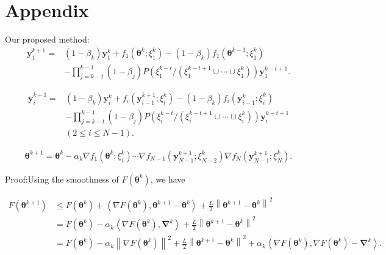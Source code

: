 

\appendix

\section{Appendix}

Our proposed method:
\begin{equation*}
\begin{split}
\boldsymbol{y}_{1}^{k+1}=&(1-\beta_k)\boldsymbol{y}_{1}^k+f_1(\boldsymbol{\theta}^k;\xi_1^k )-(1-\beta_k)f_1(\boldsymbol{\theta}^{k-1};\xi_1^k)\\
&-\prod_{j=k-t}^{k-1}(1-\beta_j)P(\xi_1^{k-t}/(\xi_1^{k-t+1}\cup\cdots \cup\xi_1^k))\boldsymbol{y}_1^{k-t+1}.
\end{split}
\end{equation*}

\begin{equation*}
\begin{split}
\boldsymbol{y}_{i}^{k+1}=&(1-\beta_k)\boldsymbol{y}_{i}^k+f_i(\boldsymbol{y}_{i-1}^{k+1};\xi_i^k )-(1-\beta_k)f_i(\boldsymbol{y}_{i-1}^{k};\xi_i^k)\\
&-\prod_{j=k-t}^{k-1}(1-\beta_j)P(\xi_i^{k-t}/(\xi_i^{k-t+1}\cup\cdots \cup\xi_i^k))\boldsymbol{y}_i^{k-t+1}\\
&(2\leq i\leq N-1).
\end{split}
\end{equation*}

\begin{equation*}
\begin{split}
\boldsymbol{\theta}^{k+1}=\boldsymbol{\theta}^k-\alpha_k\nabla f_1(\boldsymbol{\theta}^k;\xi_1^k)\cdots\nabla f_{N-1}(\boldsymbol{y}_{N-1}^{k+1};\xi_{N-2}^k)\nabla f_N(\boldsymbol{y}_{N-1}^{k+1};\xi_N^k).
\end{split}
\end{equation*}

Proof:Using the smoothness of $F(\boldsymbol{\theta}^k)$, we have

\begin{equation*}
\begin{split}
F(\boldsymbol{\theta}^{k+1})&\leq F(\boldsymbol{\theta}^k)+\left \langle \nabla F(\boldsymbol{\theta}^k),\boldsymbol{\theta}^{k+1}-\boldsymbol{\theta}^k \right \rangle+\frac{L}{2}\left \| \boldsymbol{\theta}^{k+1}-\boldsymbol{\theta}^k \right \|^2\\
&=F(\boldsymbol{\theta}^k)-\alpha_k\left \langle \nabla F(\boldsymbol{\theta}^k),\boldsymbol{\nabla}^k \right \rangle+\frac{L}{2}\left \| \boldsymbol{\theta}^{k+1}-\boldsymbol{\theta}^k \right \|^2\\
&=F(\boldsymbol{\theta}^k)-\alpha_k\left \| \nabla F(\boldsymbol{\theta}^k) \right \|^2+\frac{L}{2}\left \| \boldsymbol{\theta}^{k+1}-\boldsymbol{\theta}^k \right \|^2+\alpha_k\left \langle \nabla F(\boldsymbol{\theta}^k),\nabla F(\boldsymbol{\theta}^k)-\boldsymbol{\nabla}^k \right \rangle.
\end{split}
\end{equation*}

